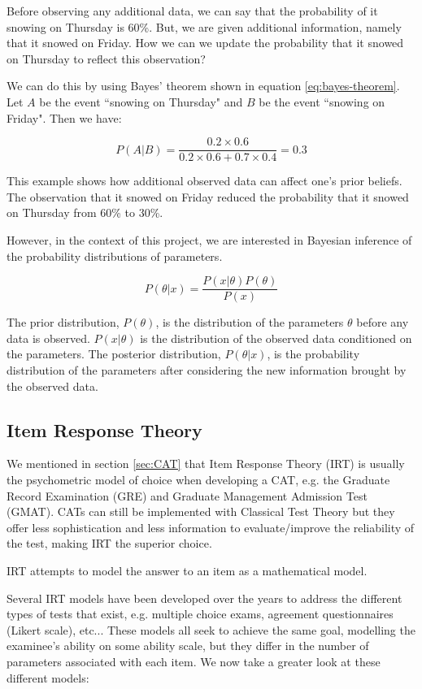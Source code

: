 Before observing any additional data, we can say that the probability of it snowing on Thursday is 60\%. But, we are given additional information, namely that it snowed on Friday. How we can we update the probability that it snowed on Thursday to reflect this observation? \newline

We can do this by using Bayes' theorem shown in equation \ref{eq:bayes-theorem}. Let $A$ be the event ``snowing on Thursday" and $B$ be the event ``snowing on Friday". Then we have:

$$P(A|B) = \dfrac{0.2 \times 0.6}{0.2 \times 0.6 + 0.7 \times 0.4} = 0.3$$

This example shows how additional observed data can affect one's prior beliefs. The observation that it snowed on Friday reduced the probability that it snowed on Thursday from 60\% to 30\%.
\newline

However, in the context of this project, we are interested in Bayesian inference of the probability distributions of parameters.

$$P(\theta|x) = \dfrac{P(x|\theta)P(\theta)}{P(x)}$$

The prior distribution, $P(\theta)$, is the distribution of the parameters $\theta$ before any data is observed. $P(x|\theta)$ is the distribution of the observed data conditioned on the parameters. The posterior distribution, $P(\theta|x)$, is the probability distribution of the parameters after considering the new information brought by the observed data.

\subsection{Item Response Theory}
\label{subsec:IRT}
We mentioned in section \ref{sec:CAT} that Item Response Theory (IRT) is usually the psychometric model of choice when developing a CAT, e.g. the Graduate Record Examination (GRE) and Graduate Management Admission Test (GMAT). CATs can still be implemented with Classical Test Theory but they offer less sophistication and less information to evaluate/improve the reliability of the test, making IRT the superior choice. \newline

IRT attempts to model the answer to an item as a mathematical model. \newline

Several IRT models have been developed over the years to address the different types of tests that exist, e.g. multiple choice exams, agreement questionnaires (Likert scale), etc... These models all seek to achieve the same goal, modelling the examinee's ability on some ability scale, but they differ in the number of parameters associated with each item. We now take a greater look at these different models:

